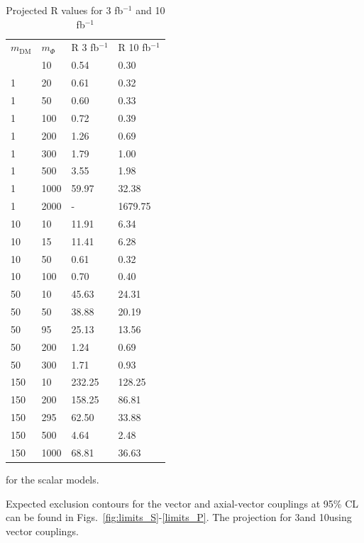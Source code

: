 \begin{table}[h]
\centering
\begin{tabular}{llll}
\hline                      
 $m_\textrm{DM}$ & $m_\Phi$  & R 3 fb$^{-1}$ & R 10 fb$^{-1}$ \\ \hlin
1	& 10	& 0.54	& 0.30 \\ \hline
1	& 20	& 0.61	& 0.32 \\ \hline
1	& 50	& 0.60	& 0.33 \\ \hline
1	& 100	& 0.72	& 0.39 \\ \hline
1	& 200	& 1.26	& 0.69 \\ \hline
1	& 300	& 1.79	& 1.00 \\ \hline
1	& 500	& 3.55	& 1.98 \\ \hline
1	& 1000	& 59.97	& 32.38 \\ \hline
1	& 2000	& -    & 1679.75 \\ \hline
10	& 10	& 11.91	& 6.34 \\ \hline 
10	& 15	& 11.41	& 6.28 \\ \hline
10	& 50	& 0.61	& 0.32 \\ \hline
10	& 100	& 0.70	& 0.40 \\ \hline
50	& 10	& 45.63	& 24.31 \\ \hline
50	& 50	& 38.88	& 20.19 \\ \hline
50	& 95	& 25.13	& 13.56 \\ \hline
50	& 200	& 1.24	& 0.69 \\ \hline
50	& 300	& 1.71	& 0.93 \\ \hline
150	& 10	& 232.25& 128.25 \\ \hline
150	& 200	& 158.25& 86.81 \\ \hline
150	& 295	& 62.50	& 33.88 \\ \hline
150	& 500	& 4.64	& 2.48 \\ \hline
150	& 1000	& 68.81	& 36.63 \\ \hline
\end{tabular}
\caption{Projected R values for 3 fb$^{-1}$ and 10 fb$^{-1}$} for the scalar models.
\label{tab:dm_S_R_values}
\end{table}

Expected exclusion contours for the vector and axial-vector couplings at 95\% CL can be found in Figs.~\ref{fig:limits_S}-\ref{limits_P}. The projection for  3\fbinv and 10\fbinv using vector couplings.


